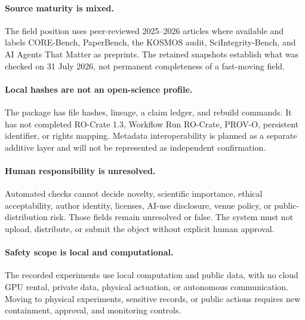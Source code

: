 \paragraph{Source maturity is mixed.}
The field position uses peer-reviewed 2025--2026 articles where available and
labels CORE-Bench, PaperBench, the KOSMOS audit, SciIntegrity-Bench, and AI
Agents That Matter as preprints. The retained snapshots establish what was
checked on 31 July 2026, not permanent completeness of a fast-moving field.

\paragraph{Local hashes are not an open-science profile.}
The package has file hashes, lineage, a claim ledger, and rebuild commands.
It has not completed RO-Crate 1.3, Workflow Run RO-Crate, PROV-O, persistent
identifier, or rights mapping. Metadata interoperability is planned as a
separate additive layer and will not be represented as independent
confirmation.

\paragraph{Human responsibility is unresolved.}
Automated checks cannot decide novelty, scientific importance, ethical
acceptability, author identity, licenses, AI-use disclosure, venue policy, or
public-distribution risk. Those fields remain unresolved or false. The system
must not upload, distribute, or submit the object without explicit human
approval.

\paragraph{Safety scope is local and computational.}
The recorded experiments use local computation and public data, with no cloud
GPU rental, private data, physical actuation, or autonomous communication.
Moving to physical experiments, sensitive records, or public actions requires
new containment, approval, and monitoring controls.
